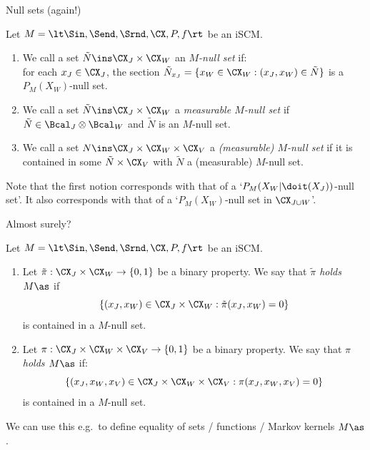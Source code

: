 \begin{frame}{Null sets (again!)}
\begin{Def}
  Let $M = \lt \Sin, \Send, \Srnd, \CX, P, f \rt$ be an iSCM.
  \begin{enumerate}
    \item We call a set $\tilde{N} \ins \CX_J \times \CX_W$ an \emph{$M$-null set} if:\\
      for each $x_J \in \CX_J$, the section $\tilde{N}_{x_J} = \{x_W \in \CX_W : (x_J,x_W) \in \tilde{N}\}$ is a $P_M(X_W)$-null set.
    \item We call a set $\tilde{N} \ins \CX_J \times \CX_W$ a \emph{measurable $M$-null set} if 
      $\tilde{N} \in \Bcal_J \otimes \Bcal_W$ and $\tilde{N}$ is an $M$-null set.
    \item We call a set $N \ins \CX_J \times \CX_W \times \CX_V$ a \emph{(measurable) $M$-null set} if
      it is contained in some $\tilde{N} \times \CX_V$ with $\tilde{N}$ a (measurable) $M$-null set.
  \end{enumerate}
\end{Def}  
Note that the first notion corresponds with that of a `$P_M(X_W | \doit(X_J))$-null set'.
It also corresponds with that of a `$P_M(X_W)$-null set in $\CX_{J \cup W}$'.
\end{frame}

\begin{frame}{Almost surely?}
\begin{Def}
  Let $M = \lt \Sin, \Send, \Srnd, \CX, P, f \rt$ be an iSCM.
  \begin{enumerate}
    \item Let $\tilde\pi : \CX_J \times \CX_W \to \{0,1\}$ be a binary property.
      We say that \emph{$\tilde\pi$ holds $M\as$} if
      $$\{(x_J,x_W) \in \CX_J \times \CX_W : \tilde\pi(x_J,x_W) = 0\}$$
      is contained in a $M$-null set.
    \item Let $\pi : \CX_J \times \CX_W \times \CX_V \to \{0,1\}$ be a binary property.
      We say that \emph{$\pi$ holds $M\as$} if:
      $$\{(x_J,x_W,x_V) \in \CX_J \times \CX_W \times \CX_V : \pi(x_J,x_W,x_V) = 0\}$$
      is contained in a $M$-null set.
  \end{enumerate}
  We can use this e.g.\ to define equality of sets / functions / Markov kernels $M\as$.
\end{Def}
\end{frame}

